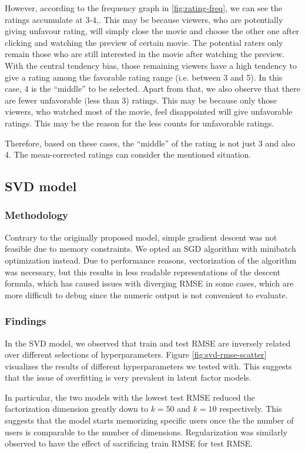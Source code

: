 \documentclass[final]{cvpr}
\begin{document}
However, according to the frequency graph in \ref{fig:rating-freq}, we can see the ratings accumulate at 3-4,.
This may be because viewers, who are potentially giving unfavour rating,
will simply close the movie and choose the other one after clicking and watching the preview of certain movie.
The potential raters only remain those who are still interested in the movie after watching the preview.
With the central tendency bias, those remaining viewers have a high tendency to give a rating among the favorable rating range (i.e. between 3 and 5).
In this case, 4 is the “middle” to be selected.
Apart from that, we also observe that there are fewer unfavorable (less than 3) ratings.
This may be because only those viewers, who watched most of the movie, feel disappointed will give unfavorable ratings.
This may be the reason for the less counts for unfavorable ratings.

Therefore, based on these cases, the “middle” of the rating is not just 3 and also 4.
The mean-corrected ratings can consider the mentioned situation.

\subsection{\ac{SVD} model}
\subsubsection{Methodology}
Contrary to the originally proposed model,
simple gradient descent was not feasible due to memory constraints.
We opted an \ac{SGD} algorithm with minibatch optimization instead.
Due to performance reasons, vectorization of the algorithm was necessary,
but this results in less readable representations of the descent formula,
which has caused issues with diverging RMSE in some cases,
which are more difficult to debug since the numeric output is not convenient to evaluate.

\subsubsection{Findings}
In the SVD model, we observed that train and test RMSE are inversely related
over different selections of hyperparameters.
Figure \ref{fig:svd-rmse-scatter} visualizes the results of different hyperparameters we tested with.
This suggests that the issue of overfitting is very prevalent in latent factor models.

In particular, the two models with the lowest test RMSE reduced the factorization dimension greatly
down to $k=50$ and $k=10$ respectively.
This suggests that the model starts memorizing specific users
once the the number of users is comparable to the number of dimensions.
Regularization was similarly observed to have the effect of sacrificing train RMSE for test RMSE.
\end{document}
